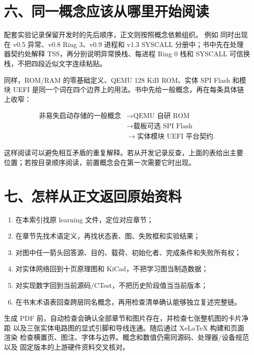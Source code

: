 \section*{六、同一概念应该从哪里开始阅读}

配套实验记录保留开发时的先后顺序，正文则按照概念依赖组织。
例如  同时出现在 v0.5 异常、v0.8 Ring 3、v0.9 进程和 v1.3
SYSCALL 分册中；书中先在处理器契约处解释 TSS，再分别说明异常换栈、每进程
Ring 0 栈和 SYSCALL 可信换栈，不把四段近似文字连续粘贴。

同样，ROM/RAM 的零基础定义、QEMU 128 KiB ROM、实体 SPI Flash 和模块 UEFI
是同一个词在四个边界上的用法。书中先给一般概念，再在每条具体链上收窄：

\[
\begin{aligned}
\text{非易失启动存储的一般概念}
&\rightarrow \text{QEMU 自研 ROM}\\
&\rightarrow \text{载板可选 SPI Flash}\\
&\rightarrow \text{实体模块 UEFI 平台契约}.
\end{aligned}
\]

这样阅读可以避免相互矛盾的重复解释。若从开发记录反查，上面的表给出主要
位置；若按目录顺序阅读，前置概念会在第一次需要它时出现。

\section*{七、怎样从正文返回原始资料}

\begin{enumerate}[leftmargin=2.2em]
  \item 在本索引找原 learning 文件，定位对应章节；
  \item 在章节先找术语定义，再找状态表、图、失败框和实验结果；
  \item 对图中任一箭头回答源、目的、载荷、初始化者、完成条件和失败所有权；
  \item 对实体网络回到十页原理图和 KiCad，不把学习图当制造数据；
  \item 对实现数字回到当前源码/CTest，不把历史阶段值当当前版本；
  \item 在书末术语表回查跨层同名概念，再用检查清单确认能够独立复述完整链。
\end{enumerate}

生成 PDF 前，自动检查会确认全部章节和图片存在，并检查七张整机图的卡片净距
以及三张实体电路图的显式引脚和导线连通。随后通过 XeLaTeX 构建和页面渲染
检查横置页、图注、字体与边界。概念和数值仍需同源码、处理器/设备规范以及
固定版本的上游硬件资料交叉核对。
